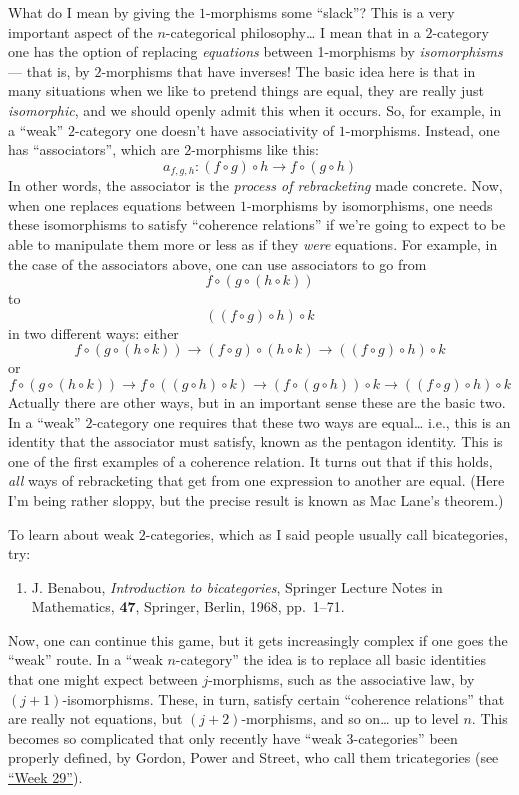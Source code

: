 \documentclass{article}
\def\tightlist{}
\begin{document}
What do I mean by giving the \(1\)-morphisms some ``slack''? This is a
very important aspect of the \(n\)-categorical philosophy\ldots{} I mean
that in a \(2\)-category one has the option of replacing
\emph{equations} between 1-morphisms by \emph{isomorphisms} --- that is,
by \(2\)-morphisms that have inverses! The basic idea here is that in
many situations when we like to pretend things are equal, they are
really just \emph{isomorphic}, and we should openly admit this when it
occurs. So, for example, in a ``weak'' \(2\)-category one doesn't have
associativity of \(1\)-morphisms. Instead, one has ``associators'',
which are \(2\)-morphisms like this:
\[a_{f,g,h}: (f \circ g) \circ h \to f \circ (g \circ h)\] In other
words, the associator is the \emph{process of rebracketing} made
concrete. Now, when one replaces equations between \(1\)-morphisms by
isomorphisms, one needs these isomorphisms to satisfy ``coherence
relations'' if we're going to expect to be able to manipulate them more
or less as if they \emph{were} equations. For example, in the case of
the associators above, one can use associators to go from
\[f \circ (g \circ (h \circ k))\] to \[((f \circ g) \circ h) \circ k\]
in two different ways: either
\[f \circ (g \circ (h \circ k)) \to (f \circ g) \circ (h \circ k) \to ((f \circ g) \circ h) \circ k\]
or
\[f \circ (g \circ (h \circ k)) \to f \circ ((g \circ h) \circ k) \to (f \circ (g \circ h)) \circ k \to ((f \circ g) \circ h) \circ k\]
Actually there are other ways, but in an important sense these are the
basic two. In a ``weak'' \(2\)-category one requires that these two ways
are equal\ldots{} i.e., this is an identity that the associator must
satisfy, known as the pentagon identity. This is one of the first
examples of a coherence relation. It turns out that if this holds,
\emph{all} ways of rebracketing that get from one expression to another
are equal. (Here I'm being rather sloppy, but the precise result is
known as Mac Lane's theorem.)

To learn about weak \(2\)-categories, which as I said people usually
call bicategories, try:

\begin{enumerate}
\def\labelenumi{\arabic{enumi})}
\setcounter{enumi}{1}
\tightlist
\item
  J. Benabou, \emph{Introduction to bicategories}, Springer Lecture Notes in Mathematics,
  \textbf{47},  Springer, Berlin, 1968, pp.~1--71.
\end{enumerate}
\noindent
Now, one can continue this game, but it gets increasingly complex if one
goes the ``weak'' route. In a ``weak \(n\)-category'' the idea is to
replace all basic identities that one might expect between
\(j\)-morphisms, such as the associative law, by \((j+1)\)-isomorphisms.
These, in turn, satisfy certain ``coherence relations'' that are really
not equations, but \((j+2)\)-morphisms, and so on\ldots{} up to level
\(n\). This becomes so complicated that only recently have ``weak
\(3\)-categories'' been properly defined, by Gordon, Power and Street,
who call them tricategories (see \protect\hyperlink{week29}{``Week
29''}).
\end{document}
